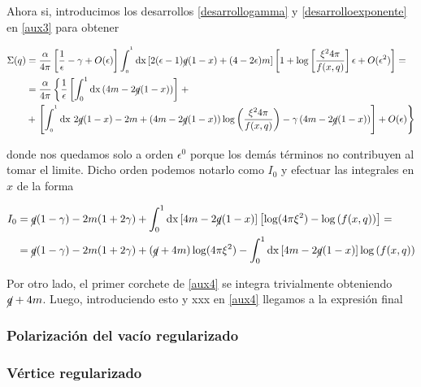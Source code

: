 \documentclass{article}
\numberwithin{equation}{section}
\begin{document}
Ahora si, introducimos los desarrollos \ref{desarrollogamma} y \ref{desarrolloexponente} en \ref{aux3} para obtener

\begin{equation}\label{aux4}
\begin{aligned}
\Sigma(q)&=\frac{\alpha}{4\pi}\left[\frac{1}{\epsilon} - \gamma + O(\epsilon) \right] \int_{_{0}}^{^{1}}\mathrm{dx} \left[2(\epsilon-1)\cancel{q}(1-x)+(4-2\epsilon)m \right] \left[1 + \log\left[\frac{\xi^2 4\pi}{f(x,q)}\right] \epsilon + O(\epsilon^2)\right]=\\
&=\frac{\alpha}{4\pi} \left\{\frac{1}{\epsilon} \left[\int_0^1 \mathrm{dx} \left( 4m - 2\cancel{q}(1-x)\right)\right] \right. + \\
&+ \left. \left[ \int_{_{0}}^{^{1}}\mathrm{dx} \  2\cancel{q}(1-x)-2m + \left( 4m - 2\cancel{q}(1-x)\right) \log \left(\frac{\xi^2 4\pi}{f(x,q)}\right) - \gamma \left( 4m - 2\cancel{q}(1-x)\right)\right]  + O(\epsilon)\right\} 
\end{aligned}
\end{equation}

donde nos quedamos solo a orden $ \epsilon^0 $ porque los demás términos no contribuyen al tomar el limite. Dicho orden podemos notarlo como $ I_0 $  y efectuar las integrales en $ x $ de la forma

\begin{equation}\label{key}
\begin{aligned}
I_0 &= \cancel{q}(1-\gamma) -2m(1 +2\gamma) + \int_{0}^{1} \mathrm{dx} \left[ 4m - 2\cancel{q}(1-x)\right]\left[ \log(4\pi \xi^2) - \log\left(f(x,q)\right)\right] =\\
&= \cancel{q}(1-\gamma) -2m(1 +2\gamma) + \left(\cancel{q}+4m\right)\log(4\pi \xi^2) - \int_{0}^{1} \mathrm{dx} \left[ 4m - 2\cancel{q}(1-x)\right]\log \left(f(x,q)\right) 
\end{aligned}
\end{equation}



Por otro lado, el primer corchete de \ref{aux4} se integra trivialmente obteniendo $ \cancel{q} + 4m $. Luego, introduciendo esto y xxx en \ref{aux4} llegamos a la expresión final  

\subsubsection{Polarización del vacío regularizado}

\subsubsection{Vértice regularizado}
\end{document}
